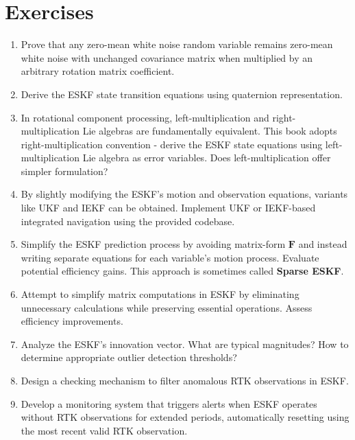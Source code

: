 \section*{Exercises}
\begin{enumerate}
\item Prove that any zero-mean white noise random variable remains zero-mean white noise with unchanged covariance matrix when multiplied by an arbitrary rotation matrix coefficient.

\item Derive the ESKF state transition equations using quaternion representation.

\item In rotational component processing, left-multiplication and right-multiplication Lie algebras are fundamentally equivalent. This book adopts right-multiplication convention - derive the ESKF state equations using left-multiplication Lie algebra as error variables. Does left-multiplication offer simpler formulation?

\item By slightly modifying the ESKF's motion and observation equations, variants like UKF and IEKF can be obtained. Implement UKF or IEKF-based integrated navigation using the provided codebase.

\item Simplify the ESKF prediction process by avoiding matrix-form $\bm{F}$ and instead writing separate equations for each variable's motion process. Evaluate potential efficiency gains. This approach is sometimes called \textbf{Sparse ESKF}.

\item Attempt to simplify matrix computations in ESKF by eliminating unnecessary calculations while preserving essential operations. Assess efficiency improvements.

\item Analyze the ESKF's innovation vector. What are typical magnitudes? How to determine appropriate outlier detection thresholds?

\item Design a checking mechanism to filter anomalous RTK observations in ESKF.

\item Develop a monitoring system that triggers alerts when ESKF operates without RTK observations for extended periods, automatically resetting using the most recent valid RTK observation.
\end{enumerate}